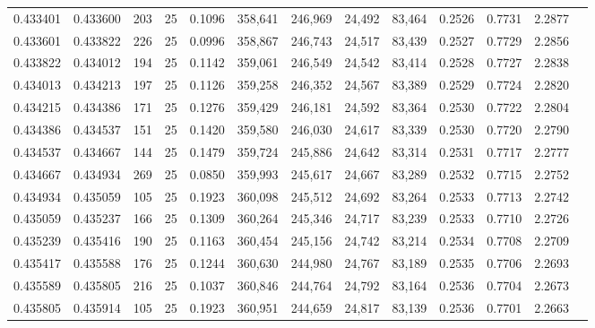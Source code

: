 \begin{tabular}{rrrrrrrrrrrrr}
0.433401 & 0.433600 &   203 &  25 &                                     0.1096 & 358,641 & 246,969 &  24,492 &  83,464 & 0.2526 & 0.7731 & 2.2877 \\
0.433601 & 0.433822 &   226 &  25 &                                     0.0996 & 358,867 & 246,743 &  24,517 &  83,439 & 0.2527 & 0.7729 & 2.2856 \\
0.433822 & 0.434012 &   194 &  25 &                                     0.1142 & 359,061 & 246,549 &  24,542 &  83,414 & 0.2528 & 0.7727 & 2.2838 \\
0.434013 & 0.434213 &   197 &  25 &                                     0.1126 & 359,258 & 246,352 &  24,567 &  83,389 & 0.2529 & 0.7724 & 2.2820 \\
0.434215 & 0.434386 &   171 &  25 &                                     0.1276 & 359,429 & 246,181 &  24,592 &  83,364 & 0.2530 & 0.7722 & 2.2804 \\
0.434386 & 0.434537 &   151 &  25 &                                     0.1420 & 359,580 & 246,030 &  24,617 &  83,339 & 0.2530 & 0.7720 & 2.2790 \\
0.434537 & 0.434667 &   144 &  25 &                                     0.1479 & 359,724 & 245,886 &  24,642 &  83,314 & 0.2531 & 0.7717 & 2.2777 \\
0.434667 & 0.434934 &   269 &  25 &                                     0.0850 & 359,993 & 245,617 &  24,667 &  83,289 & 0.2532 & 0.7715 & 2.2752 \\
0.434934 & 0.435059 &   105 &  25 &                                     0.1923 & 360,098 & 245,512 &  24,692 &  83,264 & 0.2533 & 0.7713 & 2.2742 \\
0.435059 & 0.435237 &   166 &  25 &                                     0.1309 & 360,264 & 245,346 &  24,717 &  83,239 & 0.2533 & 0.7710 & 2.2726 \\
0.435239 & 0.435416 &   190 &  25 &                                     0.1163 & 360,454 & 245,156 &  24,742 &  83,214 & 0.2534 & 0.7708 & 2.2709 \\
0.435417 & 0.435588 &   176 &  25 &                                     0.1244 & 360,630 & 244,980 &  24,767 &  83,189 & 0.2535 & 0.7706 & 2.2693 \\
0.435589 & 0.435805 &   216 &  25 &                                     0.1037 & 360,846 & 244,764 &  24,792 &  83,164 & 0.2536 & 0.7704 & 2.2673 \\
0.435805 & 0.435914 &   105 &  25 &                                     0.1923 & 360,951 & 244,659 &  24,817 &  83,139 & 0.2536 & 0.7701 & 2.2663 \\

\end{tabular}
